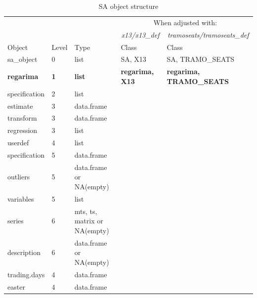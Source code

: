 \documentclass[article]{jss}
\begin{document}
\begingroup\fontsize{7}{9}\selectfont

\begin{longtable}[t]{lllll}
\caption{\label{tab:unnamed-chunk-4}SA object structure}\\
\toprule
\multicolumn{1}{c}{ } & \multicolumn{1}{c}{ } & \multicolumn{1}{c}{ } & \multicolumn{2}{c}{When adjusted with:} \\
\cmidrule(l{2pt}r{2pt}){4-5}
\multicolumn{1}{c}{\em  } & \multicolumn{1}{c}{\em  } & \multicolumn{1}{c}{\em  } & \multicolumn{1}{c}{\em x13/x13\_def} & \multicolumn{1}{c}{\em  tramoseats/tramoseats\_def} \\
\cmidrule(l{2pt}r{2pt}){4-4} \cmidrule(l{2pt}r{2pt}){5-5}
Object & Level & Type & Class & Class\\
\midrule
sa\_object & 0 & list & SA, X13 & SA, TRAMO\_SEATS\\
\textbf{\hspace{1em}regarima} & \textbf{1} & \textbf{list} & \textbf{regarima, X13} & \textbf{regarima, TRAMO\_SEATS}\\
\hspace{2em}specification & 2 & list &  & \\
\hspace{3em}estimate & 3 & data.frame &  & \\
\hspace{3em}transform & 3 & data.frame &  & \\
\addlinespace
\hspace{3em}regression & 3 & list &  & \\
\hspace{4em}userdef & 4 & list &  & \\
\hspace{5em}specification & 5 & data.frame &  & \\
\hspace{5em}outliers & 5 & data.frame or NA(empty) &  & \\
\hspace{5em}variables & 5 & list &  & \\
\addlinespace
\hspace{6em}series & 6 & mts, ts, matrix or NA(empty) &  & \\
\hspace{6em}description & 6 & data.frame or NA(empty) &  & \\
\hspace{4em}trading.days & 4 & data.frame &  & \\
\hspace{4em}easter & 4 & data.frame &  & \\

\end{longtable}
\end{document}
